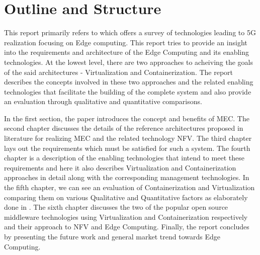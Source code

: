 \section{Outline and Structure}
This report primarily refers to \cite{taleb17} which offers a survey of technologies leading to 5G realization focusing on Edge computing. This report tries to provide an insight into the requirements and architecture of the Edge Computing and its enabling technologies. At the lowest level, there are two approaches to acheiving the goals of the said architectures - Virtualization and Containerization. The report describes the concepts involved in these two approaches and the related enabling technologies that facilitate the building of the complete system and also provide an evaluation through qualitative and quantitative comparisons. 

In the first section, the paper introduces the concept and benefits of MEC. The second chapter discusses the details of the reference architectures proposed in literature for realizing MEC and the related technology NFV. The third chapter lays out the requirements which must be satisfied for such a system. The fourth chapter is a description of the enabling technologies that intend to meet these requirements and here it also describes Virtualization and Containerization approaches in detail along with the corresponding management technologies. In the fifth chapter, we can see an evaluation of Containerization and Virtualization comparing them on various Qualitative and Quantitative factors as elaborately done in \cite{sharma16}. The sixth chapter discusses the two of the popular open source middleware technologies using Virtualization and Containerization respectively and their approach to NFV and Edge Computing. Finally, the report concludes by presenting the future work and general market trend towards Edge Computing.
